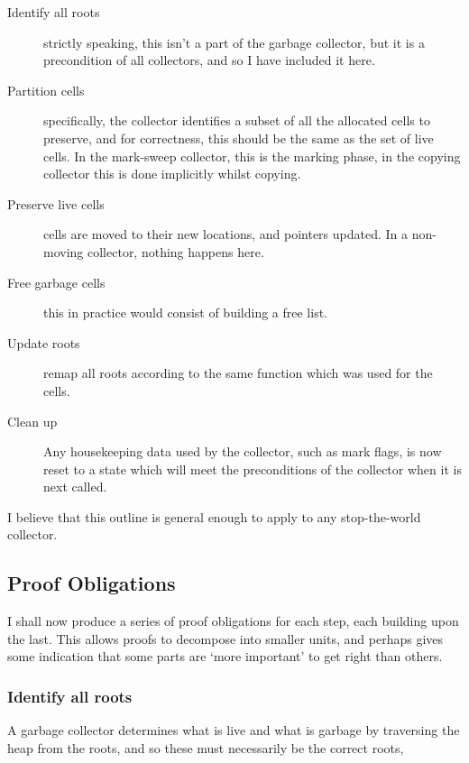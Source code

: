 \begin{description}
  \item[Identify all roots] strictly speaking, this isn't a part of
    the garbage collector, but it is a precondition of all collectors,
    and so I have included it here.

  \item[Partition cells] specifically, the collector identifies a
    subset of all the allocated cells to preserve, and for
    correctness, this should be the same as the set of live cells. In
    the mark-sweep collector, this is the marking phase, in the
    copying collector this is done implicitly whilst copying.

  \item[Preserve live cells] cells are moved to their new locations,
    and pointers updated. In a non-moving collector, nothing happens
    here.

  \item[Free garbage cells] this in practice would consist of building
    a free list.

  \item[Update roots] remap all roots according to the same function
    which was used for the cells.

  \item[Clean up] Any housekeeping data used by the collector, such as
    mark flags, is now reset to a state which will meet the
    preconditions of the collector when it is next called.
\end{description}

I believe that this outline is general enough to apply to any
stop-the-world collector.

\subsection{Proof Obligations}
\label{sec:gc-framework-obligations}

I shall now produce a series of proof obligations for each step, each
building upon the last. This allows proofs to decompose into smaller
units, and perhaps gives some indication that some parts are `more
important' to get right than others.

\subsubsection{Identify all roots}
\label{sec:gc-framework-obligations-roots}

A garbage collector determines what is live and what is garbage by
traversing the heap from the roots, and so these must necessarily be
the correct roots,

